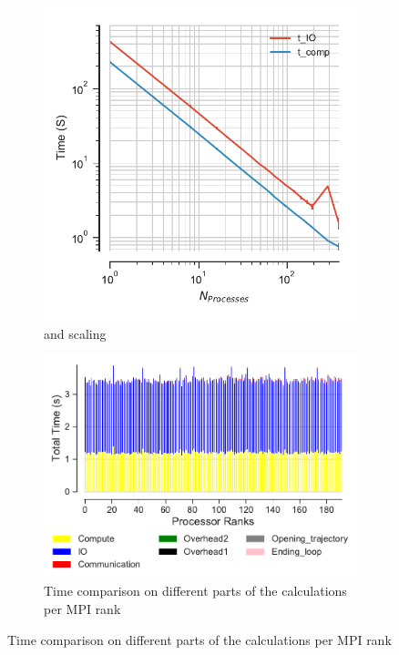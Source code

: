 \begin{figure}[ht!]
\begin{subfigure}{.4\textwidth}
\centering
  \includegraphics[width=\linewidth]{figures/hdf5-time_IO_comparison.pdf}
\caption{\tcomp and \tIO scaling}
\label{fig:ScalingComputeIO-hdf5}
\end{subfigure}
\hfill
\begin{subfigure} {.5\textwidth}
  \includegraphics[width=\linewidth]{figures/hdf5-BarPlot-rank-comparison_192_4.pdf}
  \caption{Time comparison on different parts of the calculations per MPI rank}

\end{subfigure}
\end{figure}
